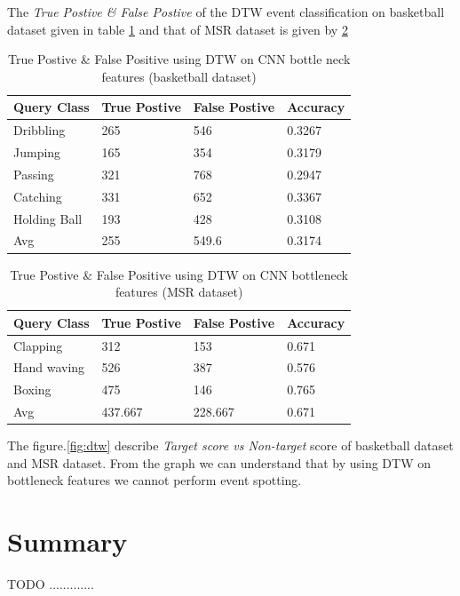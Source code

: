 The \textit{True Postive \& False Postive} of the DTW event classification on basketball dataset given in table \ref{table:cnn_dtw_res_basket} and that of MSR dataset is given by \ref{table:cnn_dtw_res_msr}

\begin{table}[h]
\centering
\begin{tabular}{|l|l|l|l|}
\hline
Query Class & True Postive & False Postive & Accuracy \\ \hline
Dribbling   &265  &546   &0.3267\\
Jumping     &165  &354   &0.3179\\
Passing     &321  &768   &0.2947\\
Catching    &331  &652   &0.3367\\
Holding Ball &193  &428   &0.3108\\
\hline
Avg         &255  &549.6 &0.3174\\
\hline  
\end{tabular}
\caption[Event classification using DTW on CNN bottleneck features (OSUPEL basketball dataset) ]{True Postive \& False Positive using DTW on CNN bottle neck features (basketball dataset)}
\label{table:cnn_dtw_res_basket}
\end{table} 

\begin{table}[h]
\centering
\begin{tabular}{|l|l|l|l|}
\hline
Query Class & True Postive & False Postive & Accuracy \\ \hline
Clapping    &312	&153	&0.671\\
Hand waving &526	&387	&0.576\\
Boxing      &475	&146	&0.765\\
\hline
Avg	&437.667	&228.667	&0.671\\
\hline  
\end{tabular}
\caption[Event classification using DTW on CNN bottleneck features (MSR Action dataset \RN{2}) ]{True Postive \& False Positive using DTW on CNN bottleneck features (MSR dataset)}
\label{table:cnn_dtw_res_msr}
\end{table} 

The figure.\ref{fig:dtw} describe \textit{Target score vs Non-target} score of basketball dataset and MSR dataset. From the graph we can understand that by using DTW on bottleneck features we cannot perform event spotting.

\section{Summary}

TODO .............